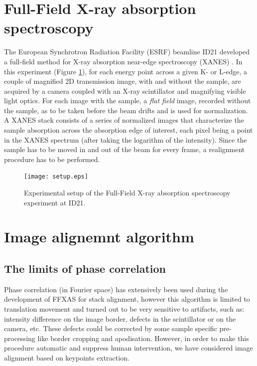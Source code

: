 \documentclass[preprint]{iucr}
\begin{document}
\section{Full-Field X-ray absorption spectroscopy}
The European Synchrotron Radiation Facility (ESRF) beamline ID21 developed a
full-field method for X-ray absorption near-edge spectroscopy
(XANES) \cite{andrade,fullfield}. 
In this experiment (Figure \ref{setup}), for each energy point across a given K-
or L-edge, a couple of magnified 2D transmission image, with and without the sample, 
are acquired by a camera coupled with an 
X-ray scintillator and magnifying visible light optics.
For each image with the sample, a \emph{flat field} image, recorded
without the sample, as to be taken before the beam drifts and is used for
normalization.
A XANES stack consists of a series of normalized images that characterize the
sample absorption across the absorption edge of interest, each pixel being a
point in the XANES spectrum (after taking the logarithm of the intensity).
Since the sample has to be moved in and out of the beam for every frame, a
realignment procedure has to be performed.

\begin{figure}
\begin{center}
\texttt{[image: setup.eps]}
\caption{\label{setup} Experimental setup of the Full-Field X-ray absorption
spectroscopy experiment at ID21.}
\end{center}
\end{figure}

\section{Image alignemnt algorithm}

\subsection{The limits of phase correlation}

Phase correlation (in Fourier space) has extensively been used during the
development of FFXAS for stack alignment, however this algorithm is limited to
translation movement and turned out to be very sensitive to artifacts, such as:
intensity difference on the image border, defects in the scintillator or on
the camera, etc.
These defects could be corrected by some sample
specific pre-processing like border cropping and apodisation. 
However, in order to make this procedure automatic and suppress human intervention, we
have considered image alignment based on keypoints extraction. 
\end{document}
